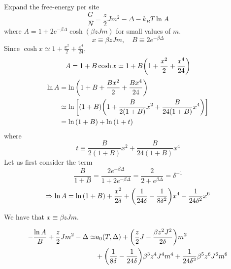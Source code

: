 \documentclass[../main/main.tex]{subfiles}
\begin{document}
\begin{exercise}{}{}
Expand the free-energy per site
\begin{equation}
  \frac{G}{N} = \frac{z}{2} J m^2 - \Delta - k_B T \ln{A}
\end{equation}
where \( A = 1 + 2 e^{-\beta \Delta } \cosh(\beta z J m) \) for small values of \( m \).
\begin{equation}
  x \equiv \beta z J m, \quad B \equiv 2 e^{-\beta \Delta }
\end{equation}
Since \( \cosh x \simeq 1 + \frac{x^2}{2} + \frac{x^4}{24} \),
\begin{equation}
  A = 1 + B \cosh x \simeq 1 + B \qty(1 + \frac{x^2}{2} + \frac{x^4}{24})
\end{equation}
\begin{equation}
\begin{split}
  \ln{A} &= \ln{\qty(1 + B + \frac{B x^2}{2} + \frac{B x^4}{24}) } \\
  &\simeq
  \ln{\qty[(1+B)\qty(1+ \frac{B}{2(1+B)}x^2 + \frac{B}{24(1+B)}x^4) ] } \\
  & = \ln{(1+B)} + \ln{(1+t)}
\end{split}
\end{equation}
where
\begin{equation}
  t \equiv \frac{B}{2(1+B)}x^2 + \frac{B}{24(1+B)}x^4
\end{equation}
Let us first consider the term
\begin{equation}
  \frac{B}{1+B} = \frac{2 e^{-\beta \Delta } }{1 + 2 e^{-\beta \Delta } } = \frac{2}{2+ e^{\beta \Delta } } = \delta ^{-1}
\end{equation}
\begin{equation}
  \Rightarrow \ln{A} = \ln{(1+B)} + \frac{x^2}{2 \delta } + \qty(\frac{1}{24 \delta } - \frac{1}{8 \delta ^2})x^4 - \frac{1}{24 \delta ^2}x^6
\end{equation}
\begin{remark}
We have that \( x \equiv \beta z J m \).
\end{remark}
\begin{equation}
\begin{split}
  - \frac{\ln{A} }{B} + \frac{z}{2} J m^2 - \Delta \simeq & a_0 (T,\Delta )
  + \qty(\frac{z}{2}J - \frac{\beta z^2 J^2}{2 \delta })m^2 \\
  &+ \qty(\frac{1}{8 \delta }- \frac{1}{24 \delta })\beta ^3 z^4 J^4 m^4
  + \frac{1}{24 \delta ^2} \beta ^5 z^6 J^6 m^6
\end{split}
\end{equation}

\end{exercise}
\end{document}
